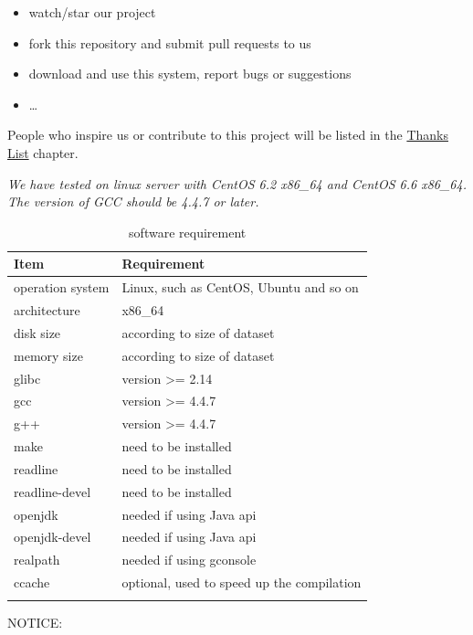 \documentclass[titlepage, a4paper, 12pt]{article}
\begin{document}
\begin{itemize}
\item
  watch/star our project
\item
  fork this repository and submit pull requests to us
\item
  download and use this system, report bugs or suggestions
\item
  \ldots{}
\end{itemize}

People who inspire us or contribute to this project will be listed in the \hyperref[chapter16]{Thanks List} chapter.

\clearpage


\emph{We have tested on linux server with CentOS 6.2 x86\_64 and CentOS 6.6 x86\_64. The version of GCC should be 4.4.7 or later.}

\begin{longtable}[c]{@{}ll@{}}
\toprule
Item & Requirement\tabularnewline
\midrule
\endhead
operation system & Linux, such as CentOS, Ubuntu and so on\tabularnewline
architecture & x86\_64\tabularnewline
disk size & according to size of dataset\tabularnewline
memory size & according to size of dataset\tabularnewline
glibc & version \textgreater{}= 2.14\tabularnewline
gcc & version \textgreater{}= 4.4.7\tabularnewline
g++ & version \textgreater{}= 4.4.7\tabularnewline
make & need to be installed\tabularnewline
readline & need to be installed\tabularnewline
readline-devel & need to be installed\tabularnewline
openjdk & needed if using Java api\tabularnewline
openjdk-devel & needed if using Java api\tabularnewline
realpath & needed if using gconsole\tabularnewline
ccache & optional, used to speed up the compilation\tabularnewline
\bottomrule
\caption{software requirement}
\end{longtable}

NOTICE:
\end{document}
